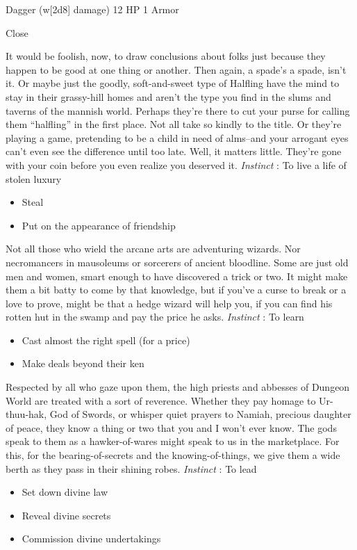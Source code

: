 

 Dagger (w[2d8] damage) 12 HP 1 Armor


 Close


 It would be foolish, now, to draw conclusions about folks just because they happen to be good at one thing or another. Then again, a spade's a spade, isn't it. Or maybe just the goodly, soft-and-sweet type of Halfling have the mind to stay in their grassy-hill homes and aren't the type you find in the slums and taverns of the mannish world. Perhaps they're there to cut your purse for calling them ``halfling'' in the first place. Not all take so kindly to the title. Or they're playing a game, pretending to be a child in need of alms--and your arrogant eyes can't even see the difference until too late. Well, it matters little. They're gone with your coin before you even realize you deserved it. \emph{Instinct}
: To live a life of stolen luxury
\begin{itemize}
\item Steal
\item Put on the appearance of friendship

\end{itemize}




 Not all those who wield the arcane arts are adventuring wizards. Nor necromancers in mausoleums or sorcerers of ancient bloodline. Some are just old men and women, smart enough to have discovered a trick or two. It might make them a bit batty to come by that knowledge, but if you've a curse to break or a love to prove, might be that a hedge wizard will help you, if you can find his rotten hut in the swamp and pay the price he asks. \emph{Instinct}
: To learn
\begin{itemize}
\item Cast almost the right spell (for a price)
\item Make deals beyond their ken

\end{itemize}



 Respected by all who gaze upon them, the high priests and abbesses of Dungeon World are treated with a sort of reverence. Whether they pay homage to Ur-thuu-hak, God of Swords, or whisper quiet prayers to Namiah, precious daughter of peace, they know a thing or two that you and I won't ever know. The gods speak to them as a hawker-of-wares might speak to us in the marketplace. For this, for the bearing-of-secrets and the knowing-of-things, we give them a wide berth as they pass in their shining robes. \emph{Instinct}
: To lead
\begin{itemize}
\item Set down divine law
\item Reveal divine secrets
\item Commission divine undertakings

\end{itemize}


